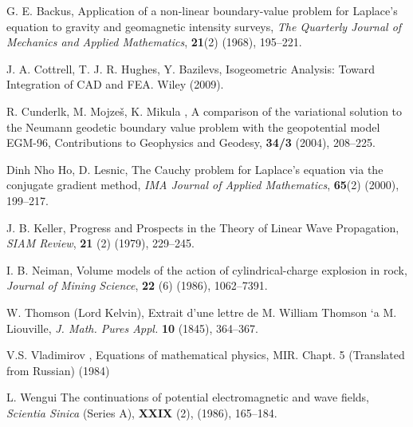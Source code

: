\documentclass{amsart}
\begin{document}
\begin{thebibliography}{10}



  G. E. Backus,  Application of a non-linear boundary-value problem for Laplace's equation to gravity and geomagnetic intensity surveys, \textit{The Quarterly Journal of Mechanics and Applied Mathematics}, \textbf{21}(2) (1968), 195--221.


 J. A. Cottrell,  T. J. R. Hughes, Y.  Bazilevs, Isogeometric Analysis: Toward Integration of CAD and FEA. Wiley  (2009).

  R. Cunderlk, M. Mojze\v{s}, K. Mikula , A comparison of the variational solution to the Neumann geodetic boundary value
problem with the geopotential model EGM-96, Contributions to
Geophysics and Geodesy, \textbf{34/3} (2004), 208--225.

 Dinh Nho Ho, D. Lesnic, The Cauchy problem for Laplace's equation via the conjugate gradient method, \textit{IMA Journal of Applied Mathematics}, \textbf{65}(2) (2000), 199--217.


 J. B. Keller, Progress and Prospects in the Theory of Linear Wave Propagation,
\textit{SIAM Review}, \textbf{21} (2) (1979),  229--245.

  I. B. Neiman,  Volume models of the action of cylindrical-charge explosion in rock, \textit{Journal of Mining Science}, \textbf{22} (6) (1986),   1062--7391.

  W. Thomson (Lord Kelvin), Extrait d'une lettre de M. William Thomson `a M. Liouville,\textit{ J. Math. Pures Appl.} \textbf{10} (1845), 364--367.

 V.S. Vladimirov ,  Equations of mathematical physics, MIR. Chapt. 5  (Translated from Russian) (1984)

  L. Wengui  The continuations of potential electromagnetic and wave fields, \textit{Scientia Sinica} (Series A), \textbf{XXIX} (2), (1986), 165--184.




\end{thebibliography}
\end{document}
